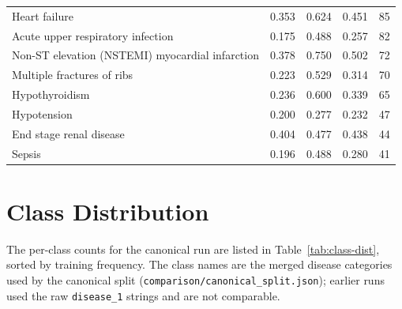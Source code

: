 \begin{table}[htbp]
\begin{tabular}{lrrrr}
    Heart failure & 0.353 & 0.624 & 0.451 & 85 \\
    Acute upper respiratory infection & 0.175 & 0.488 & 0.257 & 82 \\
    Non-ST elevation (NSTEMI) myocardial infarction & 0.378 & 0.750 & 0.502 & 72 \\
    Multiple fractures of ribs & 0.223 & 0.529 & 0.314 & 70 \\
    Hypothyroidism & 0.236 & 0.600 & 0.339 & 65 \\
    Hypotension & 0.200 & 0.277 & 0.232 & 47 \\
    End stage renal disease & 0.404 & 0.477 & 0.438 & 44 \\
    Sepsis & 0.196 & 0.488 & 0.280 & 41 \\
    \bottomrule
  \end{tabular}
\end{table}

\section{Class Distribution}

The per-class counts for the canonical run are listed in
Table~\ref{tab:class-dist}, sorted by training frequency. The class names are
the merged disease categories used by the canonical split
(\texttt{comparison/\allowbreak canonical\_split.json}); earlier runs used the raw
\texttt{disease\_1} strings and are not comparable.

